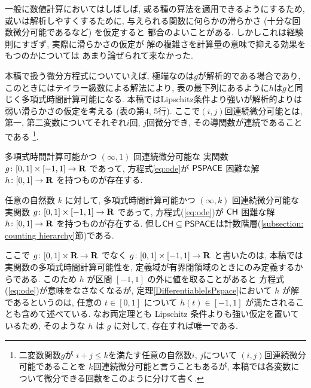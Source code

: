 一般に数値計算においてはしばしば, 
或る種の算法を適用できるようにするため, 
或いは解析しやすくするために, 
与えられる関数に何らかの滑らかさ (十分な回数微分可能であるなど) を仮定すると
都合のよいことがある. 
しかしこれは経験則にすぎず, 
実際に滑らかさの仮定が
解の複雑さを計算量の意味で抑える効果をもつのかについては
あまり論ぜられて来なかった. 

本稿で扱う微分方程式についていえば, 
極端なのは$g$が解析的である場合であり, 
このときにはテイラー級数による解法により, 
表の最下列にあるように$h$は$g$と同じく多項式時間計算可能になる. 
本稿ではLipschitz条件より強いが解析的よりは弱い滑らかさの仮定を考える
(表の第4, 5行). 
ここで$(i, j)$回連続微分可能とは, 
第一, 第二変数についてそれぞれ$i$回, $j$回微分でき, 
その導関数が連続であることである
\footnote{%
二変数関数$g$が
$i+j \le k$を満たす任意の自然数$i$, $j$について
$(i,j)$回連続微分可能であることを
$k$回連続微分可能と言うこともあるが, 
本稿では各変数について微分できる回数をこのように分けて書く.}.

 \begin{theorem}
  \label{DifferentiableIsPspace}
  多項式時間計算可能かつ $(\infty, 1)$ 回連続微分可能な
  実関数 $g \colon [0,1] \times [-1,1] \to \mathbf R$ であって, 
  方程式\eqref{eq:ode}が
  $\mathsf{PSPACE}$ 困難な解 $h \colon [0, 1] \to \mathbf R$ を持つものが存在する.
 \end{theorem}

 \begin{theorem}
  \label{KTimesIsCH}
  任意の自然数 $k$ に対して, 
  多項式時間計算可能かつ $(\infty, k)$ 回連続微分可能な
  実関数 $g \colon [0,1] \times [-1,1] \to \mathbf R$ であって, 
  方程式(\ref{eq:ode})が
  $\mathsf{CH}$ 困難な解 $h \colon [0, 1] \to \mathbf R$ を持つものが存在する.
但し$\mathsf{CH} \subseteq \mathsf{PSPACE}$は計数階層(\ref{subsection: counting hierarchy}節)である.
 \end{theorem}

ここで $g \colon [0,1] \times \mathbf R \to \mathbf R$ でなく
$g \colon [0,1] \times [-1, 1] \to \mathbf R$ と書いたのは, 
本稿では実関数の多項式時間計算可能性を, 
定義域が有界閉領域のときにのみ定義するからである. 
このため $h$ が区間 $[-1, 1]$ の外に値を取ることがあると
方程式(\ref{eq:ode})が意味をなさなくなるが, 
定理\ref{DifferentiableIsPspace}において $h$ が解であるというのは, 
任意の $t \in [0, 1]$ について $h (t) \in [-1, 1]$ が満たされることも含めて述べている.
なお両定理とも Lipschitz 条件よりも強い仮定を置いているため, 
そのような $h$ は $g$ に対して, 存在すれば唯一である. 


